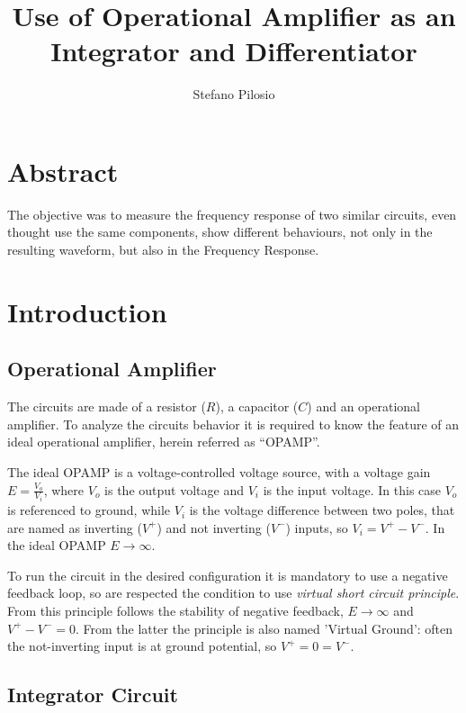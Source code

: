 \documentclass[a4paper, twocolumn]{article}
\begin{document}
\title{Use of Operational Amplifier as  an Integrator and Differentiator}
\author{Stefano Pilosio}

\maketitle

\section{Abstract}
The objective was to measure the frequency response of two similar circuits, even thought use the same components, show different behaviours, not only in the resulting waveform, but also in the Frequency Response.

\section{Introduction}

\subsection{Operational Amplifier} 

The circuits are made of a resistor ($R$), a capacitor ($C$) and an operational amplifier. To analyze the circuits behavior it is required to know the feature of an ideal operational amplifier, herein referred as ``OPAMP''.

The ideal OPAMP is a voltage-controlled voltage source, with a voltage gain $E = \frac{V_o}{V_i}$, where $V_o$ is the output voltage and $V_i$ is the input voltage. In this case $V_o$ is referenced to ground, while $V_i$ is the voltage difference between two poles, that are named as inverting ($V^+$) and not inverting ($V^-$) inputs, so $V_i=V^+-V^-$. In the ideal OPAMP $E\to\infty$.

To run the circuit in the desired configuration it is mandatory to use a negative feedback loop, so are respected the condition to use \emph{virtual short circuit principle}. From this principle follows the stability of negative feedback, $E\to\infty$ and $V^+-V^-=0$. From the latter the principle is also named 'Virtual Ground': often the not-inverting input is at ground potential, so $V^+=0=V^-$.

\subsection{Integrator Circuit}
\label{sec:integr}
\end{document}
